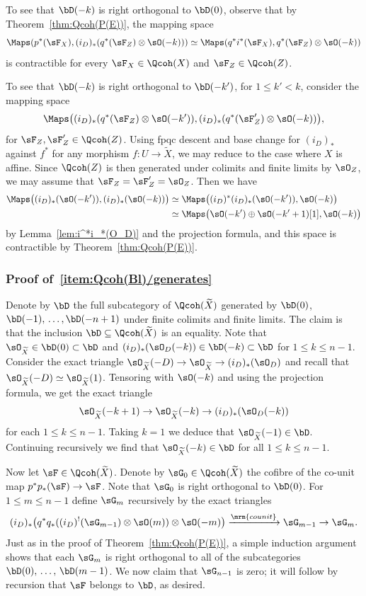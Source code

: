 To see that $\bD(-k)$ is right orthogonal to $\bD(0)$, observe that by Theorem~\ref{thm:Qcoh(P(E))}, the mapping space
\[
\Maps(p^*(\sF_X), (i_D)_*(q^*(\sF_Z) \otimes \sO(-k)))
\simeq \Maps(q^*i^*(\sF_X), q^*(\sF_Z) \otimes \sO(-k))
\]
is contractible for every $\sF_X \in \Qcoh(X)$ and $\sF_Z \in \Qcoh(Z)$.

To see that $\bD(-k)$ is right orthogonal to $\bD(-k')$, for $1\le k'< k$, consider the mapping space
\[
\Maps\big((i_D)_*(q^*(\sF_Z) \otimes \sO(-k')), (i_D)_*(q^*(\sF'_Z) \otimes \sO(-k))\big),
\]
for $\sF_Z,\sF'_Z \in \Qcoh(Z)$. Using fpqc descent and base change for $(i_D)_*$ against $f^*$ for any morphism $f : U \to \widetilde{X}$, we may reduce to the case where $X$ is affine. Since $\Qcoh(Z)$ is then generated under colimits and finite limits by $\sO_Z$, we may assume that $\sF_Z = \sF'_Z = \sO_Z$. Then we have
\begin{align*}
\Maps\big((i_D)_*(\sO(-k')), (i_D)_*(\sO(-k))\big) &\simeq \Maps\big((i_D)^*(i_D)_*(\sO(-k')), \sO(-k)\big)\\
&\simeq \Maps\big(\sO(-k') \oplus \sO(-k'+1)[1], \sO(-k)\big)
\end{align*}
by Lemma~\ref{lem:i^*i_*(O_D)} and the projection formula, and this space is contractible by Theorem~\ref{thm:Qcoh(P(E))}.

\subsubsection{Proof of~\eqref{item:Qcoh(Bl)/generates}}

Denote by $\bD$ the full subcategory of $\Qcoh(\widetilde{X})$ generated by $\bD(0)$, $\bD(-1),\,\ldots,\linebreak\bD(-n+1)$ under finite colimits and finite limits. The claim is that the inclusion $\bD \subseteq \Qcoh(\widetilde{X})$ is an equality. Note that $\sO_{\widetilde{X}} \in \bD(0) \subset \bD$ and $(i_D)_*(\sO_D(-k)) \in \bD(-k) \subset \bD$ for $1\le k\le n-1$. Consider the exact triangle $\sO_{\widetilde{X}}(-D) \to \sO_{\widetilde{X}} \to (i_D)_*(\sO_D)$ and recall that $\sO_{\widetilde{X}}(-D) \simeq \sO_{\widetilde{X}}(1)$. Tensoring with $\sO(-k)$ and using the projection formula, we get the exact triangle
\[
\sO_{\widetilde{X}}(-k+1) \to \sO_{\widetilde{X}}(-k) \to (i_D)_*(\sO_D(-k))
\]
for each $1\le k\le n-1$. Taking $k=1$ we deduce that $\sO_{\widetilde{X}}(-1) \in \bD$. Continuing recursively we find that $\sO_{\widetilde{X}}(-k) \in \bD$ for all $1\le k\le n-1$.

Now let $\sF \in \Qcoh(\widetilde{X})$. Denote by $\sG_0 \in \Qcoh(\widetilde{X})$ the cofibre of the co-unit map $p^*p_*(\sF) \to \sF$. Note that $\sG_0$ is right orthogonal to $\bD(0)$. For $1\le m\le n-1$ define $\sG_m$ recursively by the exact triangles
\[
(i_D)_*\big(q^*q_*((i_D)^!(\sG_{m-1}) \otimes \sO(m)) \otimes \sO(-m)\big)
\xrightarrow{\mrm{counit}} \sG_{m-1} \to \sG_m.
\]
Just as in the proof of Theorem~\ref{thm:Qcoh(P(E))}, a simple induction argument shows that each $\sG_m$ is right orthogonal to all of the subcategories $\bD(0),\,\ldots,\,\bD(m-1)$. We now claim that $\sG_{n-1}$ is zero; it will follow by recursion that $\sF$ belongs to $\bD$, as desired.

